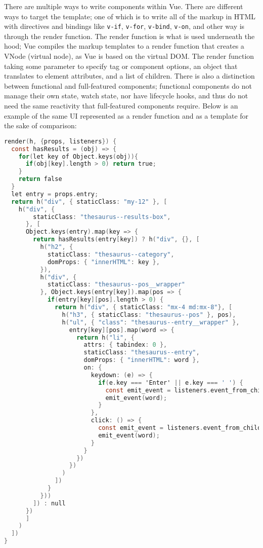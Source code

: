 \documentclass[11pt, twoside, reqno]{book}
\begin{document}
There are multiple ways to write components within Vue. There are different ways to target the template; one of which is to write all of the markup in HTML with directives and bindings like \texttt{v-if}, \texttt{v-for}, \texttt{v-bind}, \texttt{v-on}, and other way is through the render function. The render function is what is used underneath the hood; Vue compiles the markup templates to a render function that creates a VNode (virtual node), as Vue is based on the virtual DOM. The render function taking some parameter to specify tag or component options, an object that translates to element attributes, and a list of children. There is also a distinction between functional and full-featured components; functional components do not manage their own state, watch state, nor have lifecycle hooks, and thus do not need the same reactivity that full-featured components require. Below is an example of the same UI represented as a render function and as a template for the sake of comparison:
\begin{lstlisting}[language=C]
render(h, {props, listeners}) {
  const hasResults = (obj) => {
    for(let key of Object.keys(obj)){
      if(obj[key].length > 0) return true;
    }
    return false
  }
  let entry = props.entry;
  return h("div", { staticClass: "my-12" }, [
    h("div", {
        staticClass: "thesaurus--results-box",
      }, [
      Object.keys(entry).map(key => {
        return hasResults(entry[key]) ? h("div", {}, [
          h("h2", {
            staticClass: "thesaurus--category",
            domProps: { "innerHTML": key },
          }),
          h("div", {
            staticClass: "thesaurus--pos__wrapper"
          }, Object.keys(entry[key]).map(pos => {
            if(entry[key][pos].length > 0) {
              return h("div", { staticClass: "mx-4 md:mx-8"}, [
                h("h3", { staticClass: "thesaurus--pos" }, pos),
                h("ul", { "class": "thesaurus--entry__wrapper" }, 
                  entry[key][pos].map(word => {
                    return h("li", {
                      attrs: { tabindex: 0 },
                      staticClass: "thesaurus--entry",
                      domProps: { "innerHTML": word },
                      on: {
                        keydown: (e) => {
                          if(e.key === 'Enter' || e.key === ' ') {
                            const emit_event = listeners.event_from_child;
                            emit_event(word);
                          }
                        },
                        click: () => {
                          const emit_event = listeners.event_from_child;
                          emit_event(word);
                        }
                      }
                    })
                  })
                )
              ])
            }
          }))
        ]) : null
      })
      ] 
    )
  ])
}
\end{lstlisting}
\end{document}

